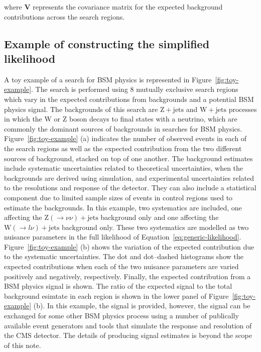 where $\mathrm{\mathbf{V}}$ represents the covariance matrix for the expected background contributions across the search regions.


\subsection{Example of constructing the simplified likelihood}
\label{sec:sl-toy}

A toy example of a search for BSM physics is represented in Figure~\ref{fig:toy-example}. The search is performed using 8 mutually exclusive search regions 
which vary in the expected contributions from backgrounds and a potential BSM physics signal. The backgrounds of this search are $\mathrm{Z+jets}$ and $\mathrm{W+jets}$ processes in which the 
W or Z boson decays to final states with a neutrino, which are commonly the dominant sources of backgrounds in searches for BSM physics. Figure~\ref{fig:toy-example} (a) indicates the 
number of observed events in each of the search regions as well as the expected contribution from the two different sources of background, stacked on top of one another. 
The background estimates include systematic uncertainties related to theoretical uncertainties, when the backgrounds are derived using 
simulation, and experimental uncertainties related to the resolutions and response of the detector. They can also include a statistical component 
due to limited sample sizes of events in control regions used to estimate the backgrounds. In this example, two systematics are included, one affecting the $\mathrm{Z}(\rightarrow \nu\nu)+\mathrm{jets}$ background only
and one affecting the $\mathrm{W}(\rightarrow l\nu)+\mathrm{jets}$ background only. These two systematics are modelled as two nuisance parameters in the full likelihood of Equation~\ref{eq:generic-likelihood}. 
Figure~\ref{fig:toy-example} (b) shows the variation of the expected contribution due to the systematic uncertainties. The dot and dot--dashed histograms show the expected 
contributions when each of the two nuisance parameters are varied positively and negatively, respectively.
Finally, the expected contribution from a BSM physics signal is shown. 
The ratio of the expected signal to the total background esimtate in each region is shown in the lower panel of Figure~\ref{fig:toy-example} (b). 
In this example, the signal is provided, however, the 
signal can be exchanged for some other BSM physics process using a number of publically available event generators and tools that simulate the response 
and resolution of the CMS detector. The details of producing signal estimates is beyond the scope of this note. 

